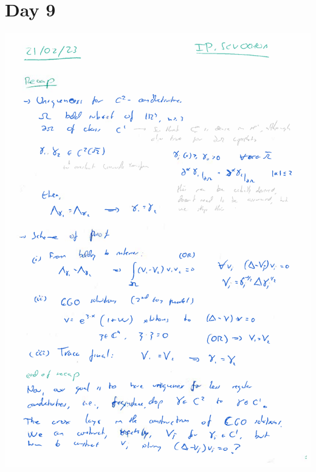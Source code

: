\documentclass{article}
\begin{document}
\section*{Day 9}

\includegraphics[width=\textwidth]{images/3.png}
\end{document}
